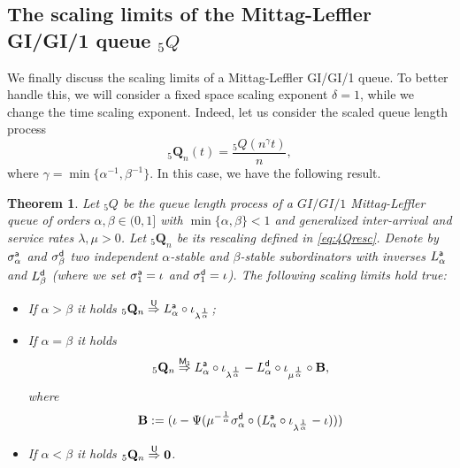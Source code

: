 \documentclass[]{amsart}
\numberwithin{equation}{section}
\newtheorem{thm}{Theorem}[section]
\theoremstyle{remark}
\theoremstyle{definition}
\begin{document}
\subsection{The scaling limits of the Mittag-Leffler GI/GI/1 queue ${}_5Q$}\label{sec:MM15}
We finally discuss the scaling limits of a Mittag-Leffler GI/GI/1 queue. To better handle this, we will consider a fixed space scaling exponent $\delta=1$, while we change the time scaling exponent. Indeed, let us consider the scaled queue length process
\begin{equation}\label{eq:4Qresc}
	{}_5\mathbf{Q}_n(t)=\frac{{}_5Q(n^\gamma t)}{n},
\end{equation}
where $\gamma=\min\{\alpha^{-1},\beta^{-1}\}$. In this case, we have the following result.
\begin{thm}\label{thm:scalingmodel5}
	Let ${}_5Q$ be the queue length process of a $GI/GI/1$ Mittag-Leffler queue of orders $\alpha,\beta \in (0,1]$ with $\min\{\alpha,\beta\}<1$ and generalized inter-arrival and service rates $\lambda,\mu>0$. Let ${}_5\mathbf{Q}_n$ be its rescaling defined in \eqref{eq:4Qresc}.
	Denote by $\sigma_\alpha^{\sf a}$ and $\sigma_\beta^{\sf d}$ two independent $\alpha$-stable and $\beta$-stable subordinators with inverses $L_\alpha^{\sf a}$ and $L_\beta^{\sf d}$ (where we set $\sigma_1^{\sf a}=\iota$ and $\sigma_1^{\sf d}=\iota$). The following scaling limits hold true:
	\begin{itemize}
		\item[$(i)$] If $\alpha>\beta$ it holds ${}_5\mathbf{Q}_n \overset{\sf U}{\Rightarrow} L_\alpha^{\sf a} \circ \iota_{\lambda^{\frac{1}{\alpha}}}$;
		\item[$(ii)$] If $\alpha=\beta$ it holds
		\begin{equation*}
			{}_5\mathbf{Q}_n \overset{\sf M_1}{\Rightarrow} L_\alpha^{\sf a} \circ \iota_{\lambda^{\frac{1}{\alpha}}}-L_\alpha^{\sf d}\circ \iota_{\mu^{\frac{1}{\alpha}}}\circ \mathbf{B},
		\end{equation*}
		where
		\begin{equation}\label{eq:Bproc}
			\mathbf{B}:=(\iota-\Psi(\mu^{-\frac{1}{\alpha}}\sigma_\alpha^{\sf d}\circ (L_\alpha^{\sf a} \circ \iota_{\lambda^{\frac{1}{\alpha}}}-\iota)))
		\end{equation}
		\item[$(iii)$] If $\alpha<\beta$ it holds ${}_5\mathbf{Q}_n \overset{\sf U}{\Rightarrow} \mathbf{0}$.
	\end{itemize}
\end{thm}
\end{document}
